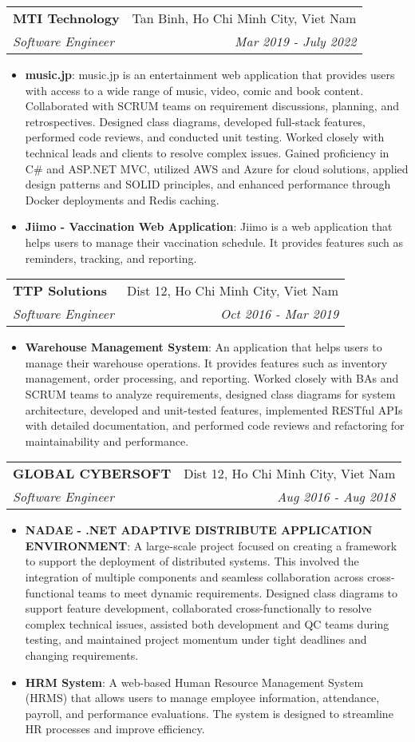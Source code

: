 \documentclass[letterpaper,11pt]{article}
\makeatletter
\newcommand{\resumeItem}[2]{
  \item\small{
    \textbf{#1}{: #2 \vspace{-2pt}}
  }
}
\newcommand{\resumeSubheading}[4]{
  \vspace{-1pt}\item
    \begin{tabular*}{0.97\textwidth}[t]{l@{\extracolsep{\fill}}r}
      \textbf{#1} & #2 \\
      \textit{\small#3} & \textit{\small #4} \\
    \end{tabular*}\vspace{-5pt}
}
\newcommand{\resumeItemListStart}{\begin{itemize}}
\newcommand{\resumeItemListEnd}{\end{itemize}\vspace{-5pt}}
\makeatother
\begin{document}
    \resumeSubheading
      {MTI Technology}{Tan Binh, Ho Chi Minh City, Viet Nam}
      {Software Engineer}{Mar 2019 - July 2022}
      \resumeItemListStart
        \resumeItem{music.jp}
          {music.jp is an entertainment web application that provides users with access to a wide range of music, video, comic and book content. Collaborated with SCRUM teams on requirement discussions, planning, and retrospectives. Designed class diagrams, developed full-stack features, performed code reviews, and conducted unit testing. Worked closely with technical leads and clients to resolve complex issues.
          Gained proficiency in C\# and ASP.NET MVC, utilized AWS and Azure for cloud solutions, applied design patterns and SOLID principles, and enhanced performance through Docker deployments and Redis caching.}
        \resumeItem{Jiimo - Vaccination Web Application}
          {Jiimo is a web application that helps users to manage their vaccination schedule. It provides features such as reminders, tracking, and reporting.}
      \resumeItemListEnd

    \resumeSubheading
      {TTP Solutions}{Dist 12, Ho Chi Minh City, Viet Nam}
      {Software Engineer}{Oct 2016 - Mar 2019}
      \resumeItemListStart
        \resumeItem{Warehouse Management System}
          {An application that helps users to manage their warehouse operations. It provides features such as inventory management, order processing, and reporting. Worked closely with BAs and SCRUM teams to analyze requirements, designed class diagrams for system architecture, developed and unit-tested features, implemented RESTful APIs with detailed documentation, and performed code reviews and refactoring for maintainability and performance.}
      \resumeItemListEnd

    \resumeSubheading
      {GLOBAL CYBERSOFT}{Dist 12, Ho Chi Minh City, Viet Nam}
      {Software Engineer}{Aug 2016 - Aug 2018}
      \resumeItemListStart
        \resumeItem{NADAE - .NET ADAPTIVE DISTRIBUTE APPLICATION ENVIRONMENT}
          {A large-scale project focused on creating a framework to support the deployment of distributed systems. This involved the integration of multiple components and seamless collaboration across cross-functional teams to meet dynamic requirements.
          Designed class diagrams to support feature development, collaborated cross-functionally to resolve complex technical issues, assisted both development and QC teams during testing, and maintained project momentum under tight deadlines and changing requirements.}
        \resumeItem{HRM System}
          {A web-based Human Resource Management System (HRMS) that allows users to manage employee information, attendance, payroll, and performance evaluations. The system is designed to streamline HR processes and improve efficiency.}
      \resumeItemListEnd
\end{document}
